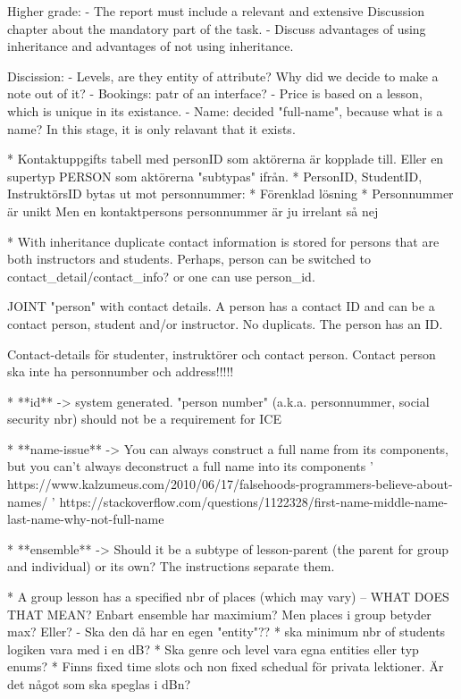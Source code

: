 \documentclass[a4paper]{scrartcl}
\begin{document}
Higher grade:
- The report must include a relevant and extensive Discussion chapter about the mandatory part of the task.
- Discuss advantages of using inheritance and advantages of not using inheritance. 


Discission: 
- Levels, are they entity of attribute? Why did we decide to make a note out of it? 
- Bookings: patr of an interface? 
- Price is based on a lesson, which is unique in its existance.
- Name: decided "full-name", because what is a name? In this stage, it is only relavant that it exists. 

* Kontaktuppgifts tabell med personID som aktörerna är kopplade till. Eller en
  supertyp PERSON som aktörerna "subtypas" ifrån. 
* PersonID, StudentID, InstruktörsID bytas ut mot personnummer:
    * Förenklad lösning
    * Personnummer är unikt
  Men en kontaktpersons personnummer är ju irrelant så nej

* With inheritance duplicate contact information is stored for persons that are both instructors and students. Perhaps, person can be switched to contact_detail/contact_info?
or one can use person_id. 

JOINT "person" with contact details. A person has a contact ID and can be a contact person, student and/or instructor. No duplicats. The person has an ID.

Contact-details för studenter, instruktörer och contact person. Contact person ska inte ha personnumber och address!!!!!

* **id** -> system generated. "person number" (a.k.a. personnummer, social security nbr) should not be a requirement for ICE

* **name-issue** -> You can always construct a full name from its components, but you can't always deconstruct a full name into its components
' https://www.kalzumeus.com/2010/06/17/falsehoods-programmers-believe-about-names/
' https://stackoverflow.com/questions/1122328/first-name-middle-name-last-name-why-not-full-name 

* **ensemble** -> Should it be a subtype of lesson-parent (the parent for group and individual) or its own?  The instructions separate them.

* A group lesson has a specified nbr of places (which may vary) -- WHAT DOES THAT MEAN?
Enbart ensemble har maximium? Men places i group betyder max? Eller?
  - Ska den då har en egen "entity"??
* ska minimum nbr of students logiken vara med i en dB?
* Ska genre och level vara egna entities eller typ enums?
* Finns fixed time slots och non fixed schedual för privata lektioner. Är det något som ska speglas i dBn?
\end{document}
